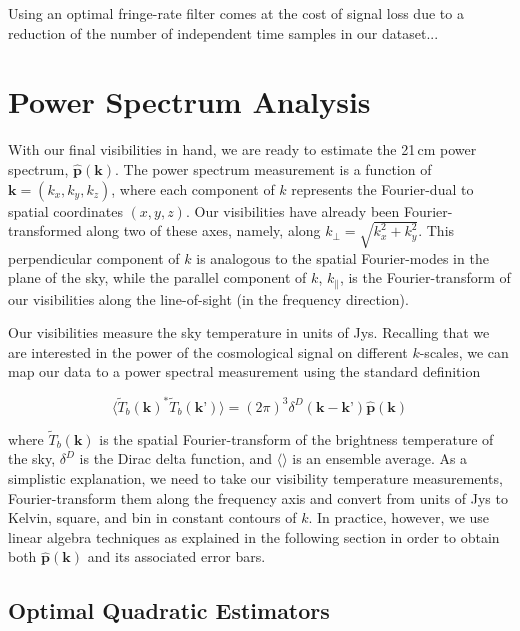 \documentclass[preprint2,numberedappendix,tighten,twocolappendix]{aastex6}  %
\begin{document}
Using an optimal fringe-rate filter comes at the cost of signal loss due to a reduction of the number of independent time samples in our dataset...

\section{Power Spectrum Analysis}
\label{sec:PS}

With our final visibilities in hand, we are ready to estimate the 21\,cm power spectrum, $\hat{\textbf{p}}(\textbf{k})$. The power spectrum measurement is a function of $\textbf{k} = (k_{x},k_{y},k_{z})$, where each component of $k$ represents the Fourier-dual to spatial coordinates $(x,y,z)$. Our visibilities have already been Fourier-transformed along two of these axes, namely, along $k_{\perp} = \sqrt{k_{x}^{2}+k_{y}^{2}}$. This perpendicular component of $k$ is analogous to the spatial Fourier-modes in the plane of the sky, while the parallel component of $k$, $k_{\parallel}$, is the Fourier-transform of our visibilities along the line-of-sight (in the frequency direction). 

Our visibilities measure the sky temperature in units of Jys. Recalling that we are interested in the power of the cosmological signal on different $k$-scales, we can map our data to a power spectral measurement using the standard definition

\begin{equation}
\label{eq:ps}
\langle \tilde{T}_{b}(\textbf{k})^{*}\tilde{T}_{b}(\textbf{k'})\rangle = (2\pi)^{3} \delta^{D}(\textbf{k}-\textbf{k'})\hat{\textbf{p}}(\textbf{k})
\end{equation}

\noindent where $\tilde{T}_{b}(\textbf{k})$ is the spatial Fourier-transform of the brightness temperature of the sky, $\delta^{D}$ is the Dirac delta function, and $\langle \rangle$ is an ensemble average. As a simplistic explanation, we need to take our visibility temperature measurements, Fourier-transform them along the frequency axis and convert from units of Jys to Kelvin, square, and bin in constant contours of $k$. In practice, however, we use linear algebra techniques as explained in the following section in order to obtain both $\hat{\textbf{p}}(\textbf{k})$ and its associated error bars. 

\subsection{Optimal Quadratic Estimators}
\label{sec:OQE}
\end{document}
